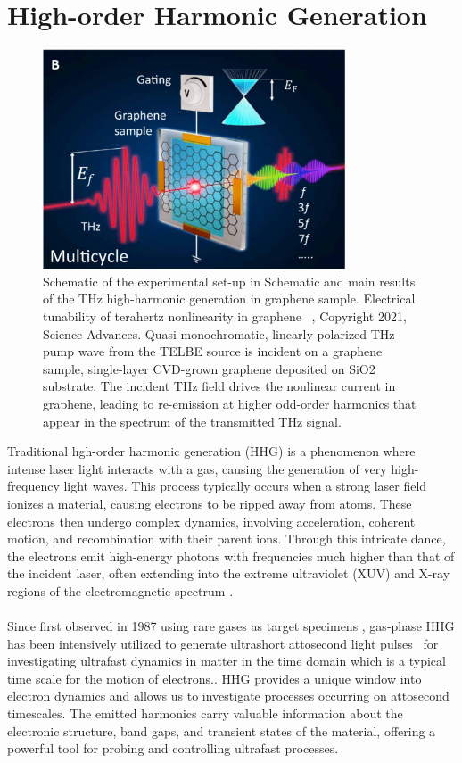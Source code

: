 \section{High-order Harmonic Generation \label{sec: intro_hhg}}
\begin{figure}[htpb]
	\centering
	\includegraphics[width=0.8\textwidth]{pic/HHG_intro.pdf}
	\caption[Lab coordinate system]{Schematic of the experimental set-up in Schematic and main results of the THz high-harmonic generation in graphene sample. Electrical tunability of terahertz nonlinearity in graphene ~\cite{kovalev2021electrical}, Copyright 2021, Science Advances. Quasi-monochromatic, linearly polarized THz pump wave from the TELBE source is incident on a graphene sample, single-layer CVD-grown graphene deposited on SiO2 substrate. The incident THz field drives the nonlinear current in graphene, leading to re-emission at higher odd-order harmonics that appear in the spectrum of the transmitted THz signal.}
	\label{fig: HHG_intro}
\end{figure}
Traditional hgh-order harmonic generation (\gls{HHG}) is a phenomenon where intense laser light interacts with a gas, causing the generation of very high-frequency light waves. This process typically occurs when a strong laser field ionizes a material, causing electrons to be ripped away from atoms.
These electrons then undergo complex dynamics, involving acceleration, coherent motion, and recombination with their parent ions. Through this intricate dance, the electrons emit high-energy photons with frequencies much higher than that of the incident laser, often extending into the extreme ultraviolet (XUV) and X-ray regions of the electromagnetic spectrum \cite{gaumnitz2017streaking}.\\
\\
Since first observed in 1987 using rare gases as target specimens \cite{McPherson:87, Ferray_1988},  gas-phase HHG has been intensively utilized to generate ultrashort attosecond light pulses~\cite{PhysRevLett.68.3535, PhysRevLett.70.1599, PhysRevA.49.2117} for investigating ultrafast dynamics in matter in the time domain which is a typical time scale for the motion of electrons.\cite{baltuvska2003attosecond, Goulielmakis2010, doi:10.1126/science.1260311, doi:10.1126/science.aag1268}. HHG provides a unique window into electron dynamics and allows us to investigate processes occurring on attosecond timescales. The emitted harmonics carry valuable information about the electronic structure, band gaps, and transient states of the material, offering a powerful tool for probing and controlling ultrafast processes.

